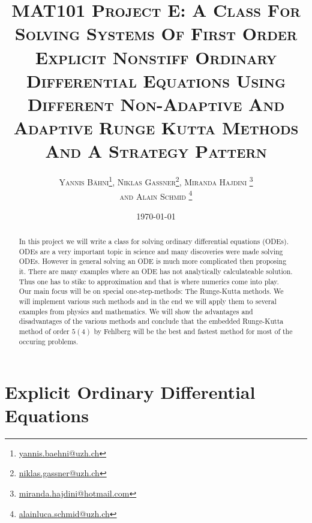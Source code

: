 
\usepackage{tikz-uml}

\title{\scshape\bfseries MAT101 Project E: A Class For Solving Systems Of First Order Explicit Nonstiff Ordinary Differential Equations Using Different Non-Adaptive And Adaptive Runge Kutta Methods And A Strategy Pattern} 

\date{\today}

\author{\scshape Yannis Bähni\footnote{\href{mailto:yannis.baehni@uzh.ch}{yannis.baehni@uzh.ch}}, Niklas Gassner\footnote{\href{mailto:niklas.gassner@uzh.ch}{niklas.gassner@uzh.ch}}, Miranda Hajdini \footnote{\href{mailto:miranda.hajdini@hotmail.com}{miranda.hajdini@hotmail.com}}\\ \scshape and Alain Schmid \footnote{\href{mailto:alainluca.schmid@uzh.ch}{alainluca.schmid@uzh.ch}}}


\thispagestyle{plain}
\addtocounter{section}{1}

\maketitle

\begin{abstract}
In this project we will write a class for solving ordinary differential equations (ODEs). ODEs are a very important topic in science and many discoveries were made solving ODEs. However in general solving an ODE is much more complicated then proposing it. There are many examples where an ODE has not analytically calculateable solution. Thus one has to stikc to approximation and that is where numerics come into play. Our main focus will be on special one-step-methods: The Runge-Kutta methods. We will implement various such methods and in the end we will apply them to several examples from physics and mathematics. We will show the advantages and disadvantages of the various methods and conclude that the embedded Runge-Kutta method of order $5(4)$ by Fehlberg will be the best and fastest method for most of the occuring problems.
\end{abstract}

\tableofcontents

\listoffigures

\section{Explicit Ordinary Differential Equations}
